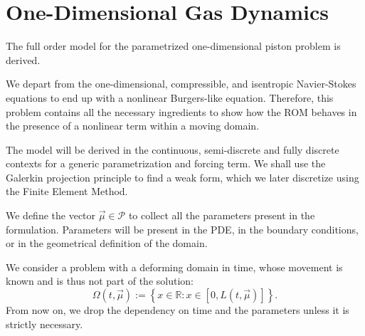 \documentclass[../../thesis.tex]{subfiles}
\begin{document}
\section{One-Dimensional Gas Dynamics}
\label{sec:fom_definition}
The full order model for the parametrized one-dimensional piston problem is derived.


We depart from the one-dimensional, compressible, and isentropic \mbox{Navier-Stokes} equations 
to end up with a nonlinear Burgers-like equation.
Therefore, this problem contains all the necessary ingredients to show how the ROM behaves 
in the presence of a nonlinear term within a moving domain.

The model will be derived in the continuous, semi-discrete and fully discrete contexts for a generic parametrization and forcing term.
We shall use the Galerkin projection principle to find a weak form, which we later discretize using the Finite Element Method. 

We define the vector $\vec{\mu} \in \mathcal{P}$ to collect all the parameters present in the formulation.
Parameters will be present in the PDE, in the boundary conditions, or in the geometrical definition of the domain. 

We consider a problem with a deforming domain in time, whose movement is known and 
is thus not part of the solution:
\begin{equation*}
    \Omega(t, \vec{\mu}) := \left\{x \in \mathbb{R} : x \in \left[0, L(t, \vec{\mu})\right]\right\}.
\end{equation*}
From now on, we drop the dependency on time and the parameters unless it is strictly necessary.
\end{document}
